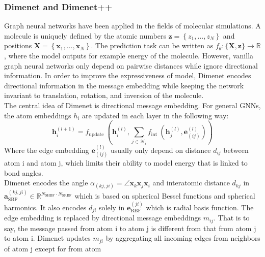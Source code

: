 \subsubsection{Dimenet and Dimenet++}

Graph neural networks have been applied in the fields of molecular simulations. 
A molecule is uniquely defined by the atomic numbers 
$\boldsymbol{z}=\left\{z_{1}, \ldots, z_{N}\right\}$ and positions 
$ \boldsymbol{X}=\left\{\boldsymbol{x}_{1}, \ldots, \boldsymbol{x}_{N}\right\}$. 
The prediction task can be written as 
$f_{\theta}:\{\boldsymbol{X}, \boldsymbol{z}\} \rightarrow \mathbb{R}$, 
where the model outputs for example energy of the molecule. However, vanilla graph 
neural networks only depend on pairwise distances while ignore directional information. 
In order to improve the expressiveness of model, Dimenet\cite*{DBLP:journals/corr/abs-2003-03123} 
encodes directional information in the message embedding while keeping the network invariant to 
translation, rotation, and inversion of the molecule\cite*{DBLP:journals/corr/abs-2003-03123}. \\
The central idea of Dimenet is directional message embedding. For general GNNs, the atom 
embeddings $h_i$ are updated in each layer in the following way:\\
\begin{equation}
    \boldsymbol{h}_{i}^{(l+1)}=f_{\text {update }}\left(\boldsymbol{h}_{i}^{(l)}, \sum_{j \in \mathcal{N}_{i}} f_{\text {int }}\left(\boldsymbol{h}_{j}^{(l)}, \boldsymbol{e}_{(i j)}^{(l)}\right)\right)
\end{equation}
Where the edge embedding $\boldsymbol{e}_{(i j)}^{(l)}$ usually only depend on 
distance $d_{ij}$ between atom i and atom j, which limits their ability to model 
energy that is linked to bond angles.\\
Dimenet encodes the angle 
$\alpha_{(k j, j i)}=\angle \boldsymbol{x}_{k} \boldsymbol{x}_{j} \boldsymbol{x}_{i}$ 
and interatomic distance $d_{kj}$ in 
$\boldsymbol{a}_{\mathrm{SBF}}^{(k j, j i)} \in \mathbb{R}^{N_{\mathrm{SHBF}} \cdot N_{\mathrm{SRBF}}}$ 
which is based on spherical Bessel functions and spherical harmonics. 
It also encodes $d_{ji}$ solely in $\boldsymbol{e}_{\mathrm{RBF}}^{(j i)}$ which is radial 
basis function.  The edge embedding is replaced by directional message embeddings $m_{ij}$. 
That is to say, the message passed from atom i to atom j is different from that from atom j to atom i. 
Dimenet updates $m_{ji}$ by aggregating all incoming edges from neighbors of atom j except for from atom 
